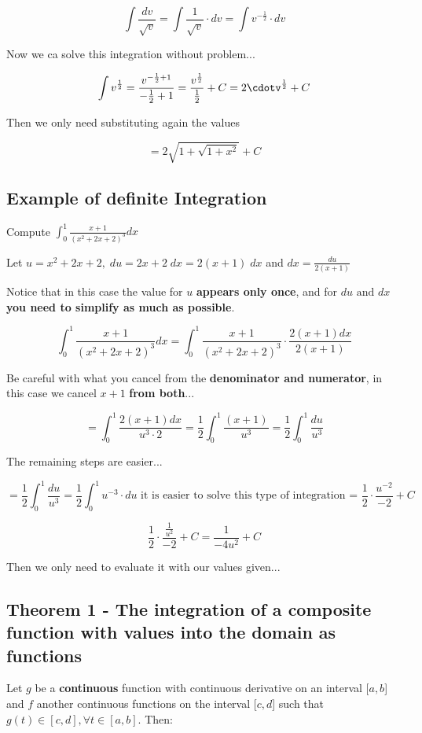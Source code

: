 \documentclass{article}
\begin{document}
\[\int \frac{dv}{\sqrt{v}} = \int \frac{1}{\sqrt{v}} \cdot dv = \int v^{-\frac{1}{2}} \cdot dv\]

Now we ca solve this integration without problem...

\[\int v^{\frac{1}{2}} = \frac{v^{-\frac{1}{2} + 1}}{-\frac{1}{2}+1} = \frac{v^{\frac{1}{2}}}{\frac{1}{2}} + C = 2\cdotv^{\frac{1}{2}} + C
\]

Then we only need substituting again the values

\[=2\sqrt{1+\sqrt{1+x^2}} + C\]

\subsection*{Example \textbf{of definite Integration}}
Compute \(\int_{0}^{1} \frac{x+1}{(x^2+2x+2)^3} dx\)

Let \(u = x^2+2x+2,\;du=2x+2\;dx = 2(x+1)\;dx\) and \(dx=\frac{du}{2(x+1)}\) 

Notice that in this case the value for \(u\) \textbf{appears only once}, and for \(du \text{ and } dx\) \textbf{you need to simplify as much as possible}.

\[
\int_{0}^{1} \frac{x+1}{(x^2+2x+2)^3} dx = \int_{0}^{1}\frac{x+1}{(x^2+2x+2)^3} \cdot \frac{2(x+1)dx}{2(x+1)}
\]

Be careful with what you cancel from the \textbf{denominator and numerator}, in this case we cancel \(x+1\) \textbf{from both}...

\[
= \int_{0}^{1} \frac{2(x+1)dx}{u^3\cdot 2} = \frac{1}{2} \int_{0}^{1} \frac{(x+1)}{u^3} = \frac{1}{2} \int_{0}^{1} \frac{du}{u^3}
\]

The remaining steps are easier...

\[= \frac{1}{2} \int_{0}^{1} \frac{du}{u^3} = \frac{1}{2} \int_{0}^{1} u^{-3} \cdot du \text{ it is easier to solve this type of integration =  }\frac{1}{2}\cdot \frac{u^{-2}}{-2} + C
\]

\[
\frac{1}{2} \cdot \frac{\frac{1}{u^2}}{-2} + C = \frac{1}{-4u^2} +C
\]

Then we only need to evaluate it with our values given...

\subsection*{Theorem 1 - The integration of a composite function with values into the domain as functions}

Let \(g\) be a \textbf{continuous} function with continuous derivative on an interval [\(a,b\)] and \(f\) another continuous functions on the interval [\(c,d\)] such that \(g(t) \in [c,d], \forall t \in [a,b]\). Then:
\end{document}

